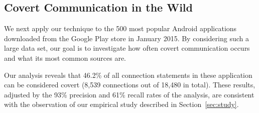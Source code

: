 \subsection{Covert Communication in the Wild}
We next apply our technique to the 500 most popular Android applications
downloaded from the Google Play store in January 2015. 
By considering such a large data set, our goal is to
investigate how often covert communication occurs and what its most common sources are.








Our analysis reveals that 46.2\% of all connection statements in these application can be considered covert (8,539 connections out of 18,480 in total).
These results, adjusted by the 93\% precision and 61\% recall rates of the analysis, are consistent with the observation of our empirical study described in Section~\ref{sec:study}.

